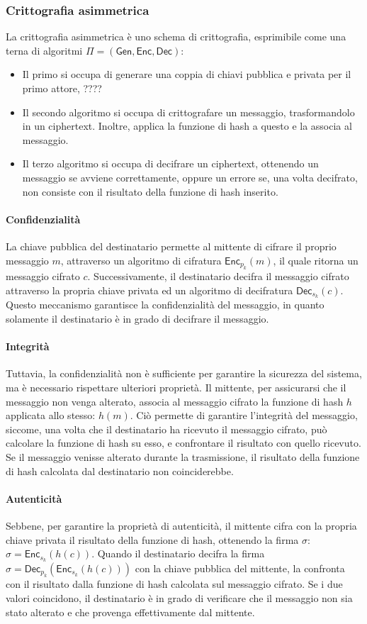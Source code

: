 \documentclass[a4paper,12pt]{article}
\begin{document}
\subsubsection{Crittografia asimmetrica}
La crittografia asimmetrica è uno schema di crittografia, esprimibile come una terna di algoritmi $\Pi=\mathsf{(Gen, Enc, Dec)}$:
\begin{itemize}
    \item Il primo si occupa di generare una coppia di chiavi pubblica e privata per il primo attore, ????
    \item Il secondo algoritmo si occupa di crittografare un messaggio, trasformandolo in un ciphertext. Inoltre, applica la funzione di hash a questo e la associa al messaggio.
    \item Il terzo algoritmo si occupa di decifrare un ciphertext, ottenendo un messaggio se avviene correttamente, oppure un errore se, una volta decifrato, non consiste con il risultato della funzione di hash inserito.
\end{itemize}
\paragraph{Confidenzialità} 
La chiave pubblica del destinatario permette al mittente di cifrare il proprio messaggio $m$, attraverso un algoritmo di cifratura $\mathsf{Enc}_{p_k}(m)$, il quale ritorna un messaggio cifrato $c$. Successivamente, il destinatario decifra il messaggio cifrato attraverso la propria chiave privata ed un algoritmo di decifratura $\mathsf{Dec}_{s_k}(c)$.
Questo meccanismo garantisce la confidenzialità del messaggio, in quanto solamente il destinatario è in grado di decifrare il messaggio.
\paragraph{Integrità}
Tuttavia, la confidenzialità non è sufficiente per garantire la sicurezza del sistema, ma è necessario rispettare ulteriori proprietà.
Il mittente, per assicurarsi che il messaggio non venga alterato, associa al messaggio cifrato la funzione di hash $h$ applicata allo stesso: $h(m)$. Ciò permette di garantire l'integrità del messaggio, siccome, una volta che il destinatario ha ricevuto il messaggio cifrato, può calcolare la funzione di hash su esso, e confrontare il risultato con quello ricevuto. Se il messaggio venisse alterato durante la trasmissione, il risultato della funzione di hash calcolata dal destinatario non coinciderebbe.
\paragraph{Autenticità}
Sebbene, per garantire la proprietà di autenticità, il mittente cifra con la propria chiave privata il risultato della funzione di hash, ottenendo la firma $\sigma$: $\sigma=\mathsf{Enc}_{s_k}(h(c))$. Quando il destinatario decifra la firma $\sigma=\mathsf{Dec}_{p_k}\left(\mathsf{Enc}_{s_k}\left(h\left(c\right)\right)\right)$ con la chiave pubblica del mittente, la confronta con il risultato dalla funzione di hash calcolata sul messaggio cifrato. Se i due valori coincidono, il destinatario è in grado di verificare che il messaggio non sia stato alterato e che provenga effettivamente dal mittente.
\end{document}
